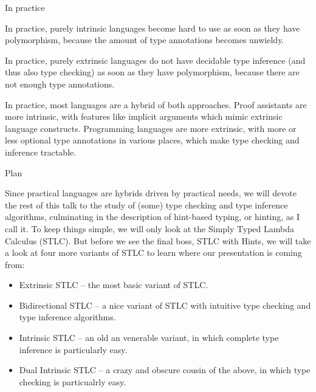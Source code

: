 \documentclass{beamer}
\begin{document}
\begin{frame}{In practice}

In practice, purely intrinsic languages become hard to use as soon as they have polymorphism, because the amount of type annotations becomes unwieldy.

\vspace{1em}

In practice, purely extrinsic languages do not have decidable type inference (and thus also type checking) as soon as they have polymorphism, because there are not enough type annotations.

\vspace{1em}

In practice, most languages are a hybrid of both approaches. Proof assistants are more intrinsic, with features like implicit arguments which mimic extrinsic language constructs. Programming languages are more extrinsic, with more or less optional type annotations in various places, which make type checking and inference tractable.

\end{frame}

\begin{frame}{Plan}

Since practical languages are hybrids driven by practical needs, we will devote the rest of this talk to the study of (some) type checking and type inference algorithms, culminating in the description of hint-based typing, or hinting, as I call it. To keep things simple, we will only look at the Simply Typed Lambda Calculus (STLC). But before we see the final boss, STLC with Hints, we will take a look at four more variants of STLC to learn where our presentation is coming from:

\begin{itemize}
  \item Extrinsic STLC -- the most basic variant of STLC.
  \item Bidirectional STLC -- a nice variant of STLC with intuitive type checking and type inference algorithms.
  \item Intrinsic STLC -- an old an venerable variant, in which complete type inference is particularly easy.
  \item Dual Intrinsic STLC -- a crazy and obscure cousin of the above, in which type checking is particualrly easy.
\end{itemize}

\end{frame}
\end{document}

